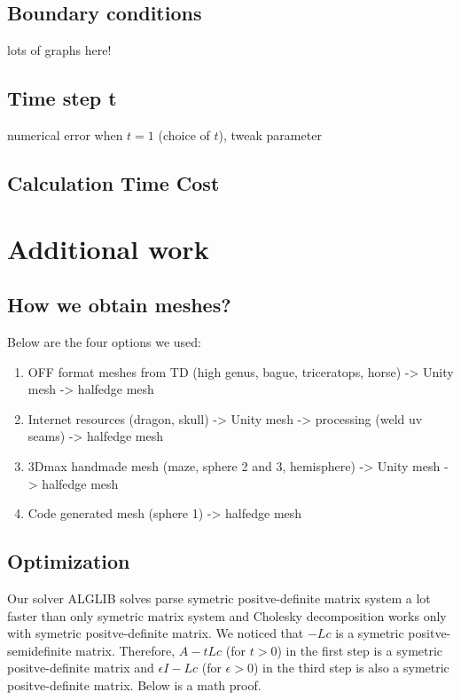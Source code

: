 \documentclass[a4paper,12pt,twoside]{article}
\begin{document}
\subsection{Boundary conditions}
lots of graphs here!

\subsection{Time step t}

numerical error when $t = 1$ (choice of $t$), tweak parameter

\subsection{Calculation Time Cost}

\section{Additional work}

\subsection{How we obtain meshes?}
Below are the four options we used:

\begin{enumerate}

\item
OFF format meshes from TD (high genus, bague, triceratops, horse) -> Unity mesh -> halfedge mesh

\item
Internet resources (dragon, skull) -> Unity mesh -> processing (weld uv seams) -> halfedge mesh

\item
3Dmax handmade mesh (maze, sphere 2 and 3, hemisphere) -> Unity mesh -> halfedge mesh

\item
Code generated mesh (sphere 1) -> halfedge mesh

\end{enumerate}

\subsection{Optimization}
Our solver ALGLIB solves parse symetric positve-definite matrix system a lot faster than only symetric matrix system and Cholesky decomposition works only with symetric positve-definite matrix.
We noticed that $-Lc$ is a symetric positve-semidefinite matrix.
Therefore, $A-tLc$ (for $t>0$) in the first step is a symetric positve-definite matrix and $\epsilon I-Lc$ (for $\epsilon >0$) in the third step is also a symetric positve-definite matrix. Below is a math proof.
\end{document}
